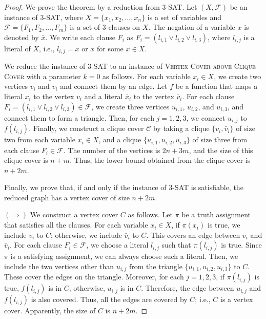 \documentclass[11pt]{article}
\begin{document}
\begin{proof}
We prove the theorem by a reduction from \textsc{3-SAT}.
Let $(X,\mathcal{F})$ be an instance of \textsc{3-SAT},
where $X=\{x_1,x_2,\ldots,x_n\}$ is a set of variables and $\mathcal{F}=\{F_1,F_2,\ldots,F_m\}$ is a set of 3-clauses on
$X$.
The negation of a variable $x$ is denoted by $\bar{x}$.
We write each clause $F_i$ as $F_i=(l_{i,1}\vee l_{i,2}\vee l_{i,3})$, where $l_{i,j}$ is a literal of $X$, i.e.,
$l_{i,j}=x$ or $\bar{x}$ for some $x\in X$.

We reduce the instance of \textsc{3-SAT} to an instance of \textsc{Vertex Cover above Clique Cover} with a
parameter $k=0$ as follows.
For each variable $x_i\in X$, we create two vertices $v_i$ and $\bar{v}_i$ and connect them by an edge.
Let $f$ be a function that maps a literal $x_i$ to the vertex $v_i$ and a literal $\bar{x}_i$ to the vertex $\bar{v}_i$.
For each clause $F_i=(l_{i,1}\vee l_{i,2}\vee l_{i,3})\in\mathcal{F}$, we create three vertices $u_{i,1}$, $u_{i,2}$,
and $u_{i,3}$, and connect them to form a triangle.
Then, for each $j=1,2,3$, we connect $u_{i,j}$ to $f(l_{i,j})$.
Finally, we construct a clique cover $\mathcal{C}$ by taking a clique $\{v_i,\bar{v}_i\}$ of size two from each
variable $x_i\in X$, and a clique $\{u_{i,1},u_{i,2},u_{i,3}\}$ of size three from each clause $F_i\in\mathcal{F}$.
The number of the vertices is $2n+3m$, and the size of this clique cover is $n+m$.
Thus, the lower bound obtained from the clique cover is $n+2m$.

Finally, we prove that, if and only if the instance of \textsc{3-SAT} is satisfiable, the reduced graph has a vertex
cover of size $n+2m$.

$(\Rightarrow)$
We construct a vertex cover $C$ as follows.
Let $\pi$ be a truth assignment that satisfies all the clauses.
For each variable $x_i\in X$, if $\pi(x_i)$ is true, we include $v_i$ to $C$; otherwise, we include
$\bar{v}_i$ to $C$.
This covers an edge between $v_i$ and $\bar{v}_i$.
For each clause $F_i\in\mathcal{F}$, we choose a literal $l_{i,j}$ such that $\pi(l_{i,j})$ is true.
Since $\pi$ is a satisfying assignment, we can always choose such a literal.
Then, we include the two vertices other than $u_{i,j}$ from the triangle $\{u_{i,1},u_{i,2},u_{i,3}\}$ to $C$.
These cover the edges on the triangle.
Moreover, for each $j=1,2,3$, if $\pi(l_{i,j})$ is true, $f(l_{i,j})$ is in $C$; otherwise, $u_{i,j}$ is in $C$.
Therefore, the edge between $u_{i,j}$ and $f(l_{i,j})$ is also covered.
Thus, all the edges are covered by $C$; i.e., $C$ is a vertex cover.
Apparently, the size of $C$ is $n+2m$.


\end{proof}
\end{document}
